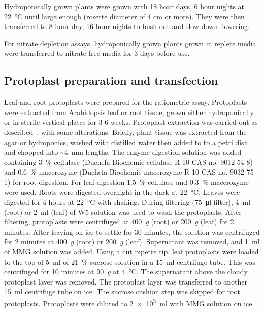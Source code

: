 Hydroponically grown plants were grown with 18 hour days, 6 hour nights at \SI{22}{\degreeCelsius} until large enough (rosette diameter of 4 cm
or more). They were then transferred to 8 hour day, 16 hour nights to
bush out and slow down flowering.

For nitrate depletion assays, hydroponically grown plants grown in
replete media were transferred to nitrate\hyp{}free media for 3 days before
use.

\subsection{Protoplast preparation and
transfection}\label{protoplast-preparation-and-transfection}

Leaf and root protoplasts were prepared for the ratiometric assay.
Protoplasts were extracted from Arabidopsis leaf or root tissue, grown either hydroponically or in sterile vertical plates for 3\hyp{}6 weeks.
Protoplast extraction was carried out as described~\autocite{yooArabidopsisMesophyllProtoplasts2007}, with some alterations.
Briefly, plant tissue was extracted from the agar or hydroponics, washed with distilled water then added to to a petri dish and chopped into \textasciitilde{}\SI{4}{\mm} lengths.
The enzyme digestion solution was added containing \SI{3}{\percent} cellulase (Duchefa Biochemie cellulase R-10 CAS no. 9012-54-8) and \SI{0.6}{\percent} macerozyme (Duchefa Biochemie macerozyme R-10 CAS no. 9032-75-1) for root digestion.
For leaf digestion \SI{1.5}{\percent} cellulase and \SI{0.3}{\percent} macerozyme were used. Roots were digested overnight in the dark at \SI{22}{\degreeCelsius}.
Leaves were digested for 4 hours at \SI{22}{\degreeCelsius} with shaking.
During filtering (\SI{75}{\micro\litre} filter), \SI{4}{\ml} (root) or \SI{2}{\ml} (leaf) of W5 solution was used to wash the protoplasts.
After filtering, protoplasts were centrifuged at 400~\textit{g} (root) or 200~\textit{g} (leaf) for 2 minutes.
After leaving on ice to settle for 30 minutes, the solution was centrifuged for 2 minutes at 400~\textit{g} (root) or 200~\textit{g} (leaf).
Supernatant was removed, and \SI{1}{\ml} of MMG solution was added.
Using a cut pipette tip, leaf protoplasts were loaded to the top of \SI{5}{\ml} of \SI{21}{\percent} sucrose solution in a \SI{15}{\ml} centrifuge tube.
This was centrifuged for 10 minutes at 90~\textit{g} at \SI{4}{\degreeCelsius}.
The supernatant above the cloudy protoplast layer was removed.
The protoplast layer was transferred to another \SI{15}{\ml} centrifuge tube on ice.
The sucrose cushion step was skipped for root protoplasts.
Protoplasts were diluted to \SI{2e5}{\ml} with MMG solution on ice.

